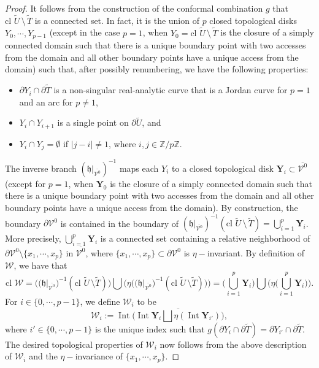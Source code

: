 \documentclass[10pt,a4paper]{amsart}
\DeclareMathOperator{\Int}{Int}
\def\Z{{\mathbb{Z}}}
\def\cV{\mathcal {V}}
\def\cW{\mathcal {W}}
\newcommand{\clo}{{\text{cl}}\,\,}
\newcommand{\sm}{\setminus}
\renewcommand{\tilde}{\widetilde}
\begin{document}
\begin{proof}
It follows from the construction of the conformal combination $g$ that $\clo\tilde U\,\setminus\, \tilde T$ is a connected set. In fact, it is the union of $p$ closed topological disks $Y_0,\cdots,Y_{p-1}$ (except in the case $p=1$, when $Y_0=\clo\tilde U\,\setminus\, \tilde T$ is the closure of a simply connected domain such that there is a unique boundary point with two accesses from the domain and all other boundary points have a unique access from the domain)  such that, after possibly renumbering, we have the following properties:
\begin{itemize}[leftmargin=8mm]
\item $\partial Y_i\cap\partial \tilde T$ is a non-singular real-analytic curve that is a Jordan curve for $p=1$ and an arc for $p\neq 1$,
\item $Y_i\cap Y_{i+1}$ is a single point on $\partial\tilde U$, and
\item $Y_i\cap Y_j=\emptyset$ if $\vert j-i\vert\neq1$, where $i,j\in\Z/p\Z$.
\end{itemize}
The inverse branch $(\mathfrak{h}\vert_{\overline{\cV^0}})^{-1}$ maps each $Y_i$ to a closed topological disk $\pmb{Y}_i\subset \overline{\cV^0}$ (except for $p=1$, when $\pmb{Y}_0$ is the closure of a simply connected domain such that there is a unique boundary point with two accesses from the domain and all other boundary points have a unique access from the domain). By construction, the boundary $\partial\cV^0$ is contained in the boundary of $\left(\mathfrak{h}\vert_{\overline{\cV^0}}\right)^{-1}(\clo \tilde U\,\sm\,\tilde T)=\bigcup_{i=1}^p \pmb{Y}_i$. More precisely, $\bigcup_{i=1}^p \pmb{Y}_i$ is a connected set  containing a relative neighborhood of $\partial\cV^0\setminus\{x_1,\cdots,x_p\}$ in $\overline{\cV^0}$, where $\{x_1,\cdots,x_p\}\subset\partial\cV^0$ is $\eta-$invariant.
By definition of $\pmb{\cW}$, we have that
\begin{equation*}
\clo \pmb{\mathcal{W}} = \Bigg(\big(\mathfrak{h}\big|_{\overline{\cV^0}}\big)^{-1}(\clo\tilde U\,\sm\tilde T)\Bigg)\bigcup\Bigg(\eta\Big(\big(\mathfrak{h}\big|_{\overline{\cV^0}}\big)^{-1}(\clo\tilde U\,\sm\tilde T)\Big)\Bigg)
= \Big(\bigcup_{i=1}^p \pmb{Y}_i\Big)\bigcup\Bigg(\eta\Big(\bigcup_{i=1}^p \pmb{Y}_i\Big)\Bigg).
\end{equation*}
For $i\in\{0,\cdots,p-1\}$, we define $\pmb{\cW}_i$ to be 
$$
\pmb{\cW}_i:=\Int{\Bigg(\overline{\Int{\pmb{Y}_i}\bigsqcup\eta(\Int{\pmb{Y}_{i'}})}\Bigg)},
$$ 
where $i'\in\{0,\cdots,p-1\}$ is the unique index such that $g(\partial Y_i\cap\partial\tilde T)=\partial Y_{i'}\cap\partial\tilde T$.
The desired topological properties of $\pmb{\cW}_i$ now follows from the above description of $\pmb{\cW}_i$ and the $\eta-$invariance of $\{x_1,\cdots,x_p\}$.
\end{proof}
\end{document}
